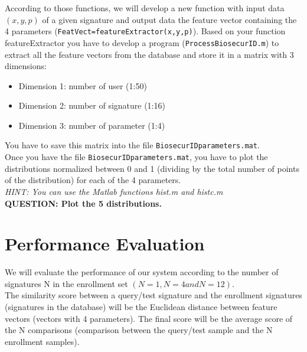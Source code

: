 \documentclass[a4paper]{article}
\def\inline{\lstinline[basicstyle=\ttfamily,keywordstyle={}]}
\begin{document}
{According to those functions, we will develop a new function with input data \((x,y,p)\) of a given signature and output data the feature vector containing the 4 parameters (\inline{FeatVect=featureExtractor(x,y,p)}).
Based on your function featureExtractor you have to develop a program (\inline{ProcessBiosecurID.m}) to extract all the feature vectors from the database and store it in a matrix with 3 dimensions:

\begin{itemize}
\item	Dimension 1: number of user (1:50)
\item	Dimension 2: number of signature (1:16)
\item Dimension 3: number of parameter (1:4)
\end{itemize}

You have to save this matrix into the file \inline{BiosecurIDparameters.mat}.\\

Once you have the file \inline{BiosecurIDparameters.mat}, you have to plot the distributions normalized between 0 and 1 (dividing by the total number of points of the distribution) for each of the 4 parameters. \\
\emph{HINT: You can use the Matlab functions hist.m and histc.m}\\

\textbf{QUESTION:  Plot the 5 distributions.}


\section{Performance Evaluation}

We will evaluate the performance of our system according to the number of signatures N in the enrollment set \((N=1, N=4 and N=12)\).\\

The similarity score between a query/test signature and the enrollment signatures (signatures in the database) will be the Euclidean distance between feature vectors (vectors with 4 parameters).  The final score will be the average score of the N comparisons (comparison between the query/test sample and the N enrollment samples).\\

}
\end{document}

